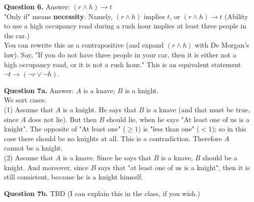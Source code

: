 \documentclass[jou]{apa6}
\begin{document}
\vspace{10pt}
{\bf Question 6.} Answer: $(r \wedge h) \rightarrow t$\\
"Only if" means {\bf necessity}. Namely, $(r \wedge h)$ implies $t$, 
or $(r \wedge h) \rightarrow t$ (Ability to use a high occupancy road during a rush 
hour implies at least three people in the car.)\\
You can rewrite this as a contrapositive (and expand $(r \wedge h)$ 
with De Morgan's law). Say, "If you do not have three people
in your car, then it is either not a high occupancy road, or it is not a rush hour."
This is an equivalent statement $\neg t \rightarrow (\neg r \vee \neg h)$. 


\vspace{10pt}
{\bf Question 7a.} Answer: $A$ is a knave; $B$ is a knight.\\
We sort cases.\\
(1) Assume that $A$ is a knight. He says that $B$ is a knave (and that must be true, 
since $A$ does not lie). 
But then $B$ should lie, when he says "At least one of us is a knight". 
The opposite of "At least one" ($\geq 1$) is "less than one" ($<1$); so in this
case there should be no knights at all. This is a contradiction. Therefore $A$ cannot be a knight.\\
(2) Assume that $A$ is a knave. Since he says that $B$ is a knave, $B$ should be a knight. 
And moreover, since $B$ says that "at least one of us is a knight", then 
it is still consistent, because he is a knight himself. 

\vspace{10pt}
{\bf Question 7b.} TBD (I can explain this in the class, if you wish.)
\end{document}
